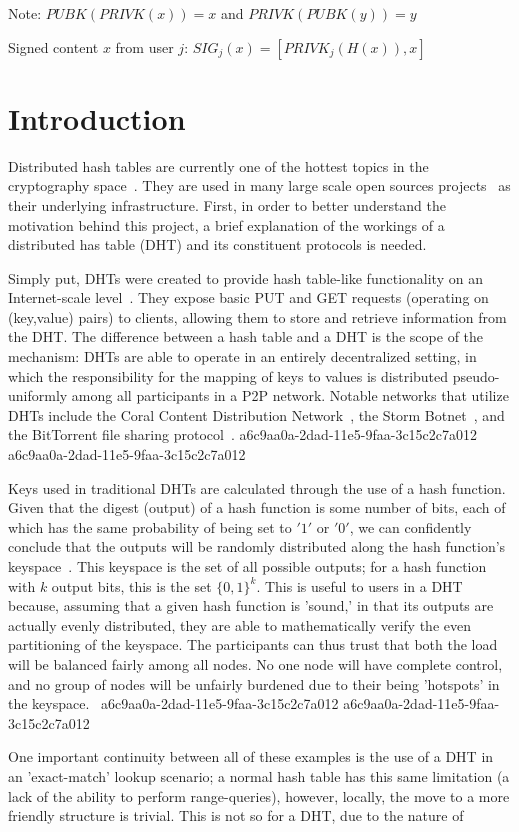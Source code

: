 \documentclass[12pt]{article}
\begin{document}
Note: $PUBK(PRIVK(x)) = x$ and $PRIVK(PUBK(y)) = y$~

Signed content $x$ from user $j$: $SIG_j(x) = \left[ PRIVK_j( H(x) ), x \right]$

\section{Introduction}
\par Distributed hash tables are currently one of the hottest topics in the cryptography space~\cite{Stoica:2001dj,Rowstron:2001ea,Ratnasamy:2001wn}. They are used in many large scale open sources projects~\cite{Freitas:2013tb,Xu:2010vs,Perfitt:2010fh} as their underlying infrastructure. First, in order to better understand the motivation behind this project, a brief explanation of the workings of a distributed has table (DHT) and its constituent protocols is needed.

\par Simply put, DHTs were created to provide hash table-like functionality on an Internet-scale level~\cite{Ratnasamy:2001wn}. They expose basic PUT and GET requests (operating on (key,value) pairs) to clients, allowing them to store and retrieve information from the DHT. The difference between a hash table and a DHT is the scope of the mechanism: DHTs are able to operate in an entirely decentralized setting, in which the responsibility for the mapping of keys to values is distributed pseudo-uniformly among all participants in a P2P network. Notable networks that utilize DHTs include the Coral Content Distribution Network~\cite{Freedman:2004vb}, the Storm Botnet~\cite{Holz:2008uk}, and the BitTorrent file sharing protocol~\cite{Cohen:y1_8mBnw}.
a6c9aa0a-2dad-11e5-9faa-3c15c2c7a012
a6c9aa0a-2dad-11e5-9faa-3c15c2c7a012\par Keys used in traditional DHTs are calculated through the use of a hash function. Given that the digest (output) of a hash function is some number of bits, each of which has the same probability of being set to $'1'$ or $'0'$, we can confidently conclude that the outputs will be randomly distributed along the hash function's keyspace~. This keyspace is the set of all possible outputs; for a hash function with $k$ output bits, this is the set $\{0,1\}^k$. This is useful to users in a DHT because, assuming that a given hash function is 'sound,' in that its outputs are actually evenly distributed, they are able to mathematically verify the even partitioning of the keyspace. The participants can thus trust that both the load will be balanced fairly among all nodes. No one node will have complete control, and no group of nodes will be unfairly burdened due to their being 'hotspots' in the keyspace.~
a6c9aa0a-2dad-11e5-9faa-3c15c2c7a012
a6c9aa0a-2dad-11e5-9faa-3c15c2c7a012\par One important continuity between all of these examples is the use of a DHT in an 'exact-match' lookup scenario; a normal hash table has this same limitation (a lack of the ability to perform range-queries), however, locally, the move to a more friendly structure is trivial. This is not so for a DHT, due to the nature of
\printbibliography
\end{document}
